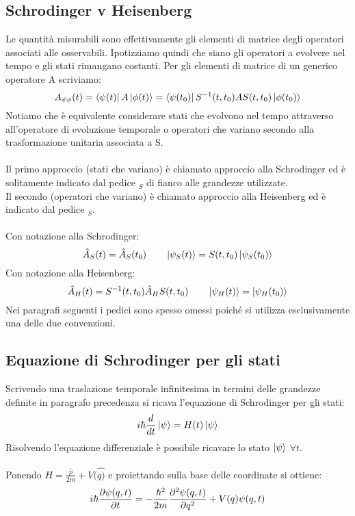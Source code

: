 \documentclass{article}
\begin{document}
\subsection{Schrodinger v Heisenberg}
Le quantità misurabili sono effettivamente gli elementi di matrice degli operatori associati alle osservabili. Ipotizziamo quindi che siano gli operatori a evolvere nel tempo e gli stati rimangano costanti. Per gli elementi di matrice di un generico operatore A scriviamo:
$$ A_{\psi\phi}(t)=\bra{\psi(t)}A\ket{\phi(t)}=\bra{\psi(t_0)}S^{-1}(t,t_0)AS(t,t_0)\ket{\phi(t_0)} $$
Notiamo che è equivalente considerare stati che evolvono nel tempo attraverso all'operatore di evoluzione temporale o operatori che variano secondo alla trasformazione unitaria associata a S.\\\\
Il primo approccio (stati che variano) è chiamato approccio alla Schrodinger ed è solitamente indicato dal pedice $_S$ di fianco alle grandezze utilizzate.\\
Il secondo (operatori che variano) è chiamato approccio alla Heisenberg ed è indicato dal pedice $_S$.\\\\
Con notazione alla Schrodinger:
$$ \hat{A}_S(t)=\hat{A}_S(t_0) \qquad \ket{\psi_S(t)}=S(t,t_0)\ket{\psi_S(t_0)} $$
Con notazione alla Heisenberg:
$$ \hat{A}_H(t)=S^{-1}(t,t_0)\hat{A}_HS(t,t_0) \qquad \ket{\psi_H(t)}=\ket{\psi_H(t_0)} $$
Nei paragrafi seguenti i pedici sono spesso omessi poiché si utilizza esclusivamente una delle due convenzioni.

\subsection{Equazione di Schrodinger per gli stati}
Scrivendo una traslazione temporale infinitesima in termini delle grandezze definite in paragrafo precedenza si ricava l'equazione di Schrodinger per gli stati:
$$ i\hbar\frac{d}{dt}\ket{\psi}=H(t)\ket{\psi} $$
Risolvendo l'equazione differenziale è possibile ricavare lo stato $\ket{\psi}$ $\forall t$.\\\\
Ponendo $H=\frac{\hat{p}}{2m}+V(\hat{q)}$ e proiettando sulla base delle coordinate si ottiene:
$$ i\hbar\pdv{\psi(q,t)}{t}=-\frac{\hbar^2}{2m}\pdv[2]{\psi(q,t)}{q}+V(q)\psi(q,t)$$
\end{document}
